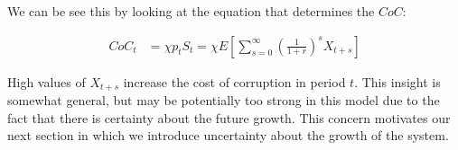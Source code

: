 We can be see this by looking at the equation that determines the $CoC$:

\begin{align*}
  CoC_t &= \chi p_t S_t = \chi E \left[ \sum_{s=0}^{\infty} \left(\frac{1}{1 + r} \right)^s X_{t+s} \right]
\end{align*}

High values of $X_{t + s}$ increase the cost of corruption in period $t$. This insight is somewhat
general, but may be potentially too strong in this model due to the fact that there is certainty
about the future growth. This concern motivates our next section in which we introduce uncertainty
about the growth of the system.
